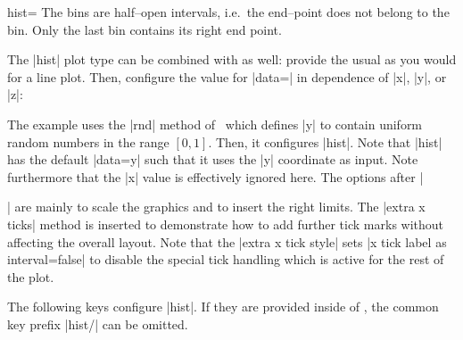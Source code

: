 \begin{plottype}[/pgfplots]{hist=\textcolor{black}{\normalfont{}}}
	The bins are half--open intervals, i.e.\ the end--point does not belong to the bin. Only the last bin contains its right end point.
\pgfplotsexpensiveexample
\begin{codeexample}[]
\begin{tikzpicture}
\begin{axis}[
  ybar interval,
  xtick=,%
  xticklabel=
    {$[\pgfmathprintnumber\tick,%
	   \pgfmathprintnumber\nexttick)$}
]
\addplot+[hist={data=x}]
	file {plotdata/pgfplots.randn.dat};
	
\end{axis}
\end{tikzpicture}
\end{codeexample}

	The |hist| plot type can be combined with  as well: provide the usual  as you would for a line plot. Then, configure the value for |data=| in dependence of |x|, |y|, or |z|: 
\pgfplotsexpensiveexample
\begin{codeexample}[]
\begin{tikzpicture}
\begin{axis}[
  tiny,
  height=4cm,width=12cm,
  ybar interval,
  ymin=0,
  xmin=0,xmax=1,
  axis on top,
  extra x ticks={0,1},
  extra x tick style={
    grid=none,
    x tick label as interval=false,
    xticklabel=$\pgfmathprintnumber\tick$
  },
  xticklabel={$[\pgfmathprintnumber[fixed]\tick,\cdot)$}
]
	\addplot+[samples=200,hist] {rnd};
\end{axis}
\end{tikzpicture}
\end{codeexample}
	\noindent The example uses the |rnd| method of \pgfname\ which defines |y| to contain uniform random numbers in the range $[0,1]$. Then, it configures |hist|. Note that |hist| has the default |data=y| such that it uses the |y| coordinate as input. Note furthermore that the |x| value is effectively ignored here. The options after |\begin{axis}[...]| are mainly to scale the graphics and to insert the right limits. The |extra x ticks| method is inserted to demonstrate how to add further tick marks without affecting the overall layout. Note that the |extra x tick style| sets |x tick label as interval=false| to disable the special tick handling which is active for the rest of the plot.

	The following keys configure |hist|. If they are provided inside of , the common key prefix |hist/| can be omitted.


\end{axis}
\end{plottype}
